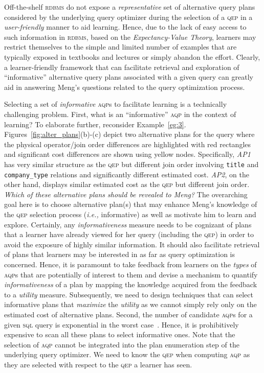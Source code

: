 \documentclass[11pt]{article}
\newcommand{\ie}{\emph{i.e.,}\xspace}
\begin{document}
Off-the-shelf \textsc{rdbms} do not expose a \textit{representative} set of alternative query plans considered by the underlying query optimizer during the selection of a \textsc{qep} in a \emph{user-friendly} manner to aid learning. Hence, due to the lack of easy access to such information in \textsc{rdbms}, based on the \textit{Expectancy-Value Theory}, learners may restrict themselves to the simple and limited number of examples that are typically exposed in textbooks and lectures or simply abandon the effort. Clearly, a learner-friendly framework that can facilitate retrieval and exploration of ``informative'' alternative query plans associated with a given query can greatly aid in answering Meng's questions related to the query optimization process. 

Selecting a set of \textit{informative} \textsc{aqp}s to facilitate learning is a technically challenging problem. First, what is an ``informative'' \textsc{aqp} in the context of learning? To elaborate further, reconsider Example~\ref{eg:3}. Figures~\ref{fig:alter_plans}(b)-(c) depict two alternative plans for the query where the physical operator/join order differences are highlighted with red rectangles and significant cost differences are shown using yellow nodes. Specifically, \textit{AP1} has very similar structure as the \textsc{qep} but different join order involving \texttt{title} and \texttt{company\_type} relations and significantly different estimated cost. \textit{AP2}, on the other hand, displays similar estimated cost as the \textsc{qep}  but different join order. \textit{Which of these alternative plans should be revealed to Meng?} The overarching goal here is to  choose alternative plan(s)  that may enhance Meng's knowledge of the \textsc{qep} selection process (\ie informative) as well as motivate him to learn and explore. Certainly, any \textit{informativeness} measure needs to be cognizant of plans that a learner have already viewed for her query (including the \textsc{qep}) in order to avoid the exposure of highly similar information. It should also facilitate retrieval of plans that learners may be interested in as far as query optimization is concerned. Hence, it is paramount to take feedback from learners on the \textit{types} of \textsc{aqp}s that are potentially of interest to them and devise a mechanism to quantify \textit{informativeness} of a plan by mapping the knowledge acquired from the feedback to a \textit{utility} measure. Subsequently, we need to design techniques that can select informative plans that  \textit{maximize} the \textit{utility} as we cannot simply rely only on the estimated cost of alternative plans.  Second, the number of candidate \textsc{aqp}s for a given \textsc{sql} query is exponential in the worst case~\cite{SC98}. Hence, it is prohibitively expensive to scan all these plans to select informative ones. Note that the selection of \textsc{aqp} cannot be integrated into the plan enumeration step of the underlying query optimizer. We need to know the \textsc{qep} when computing \textsc{aqp} as they are selected with respect to the \textsc{qep} a learner has seen. 
	
\end{document}
